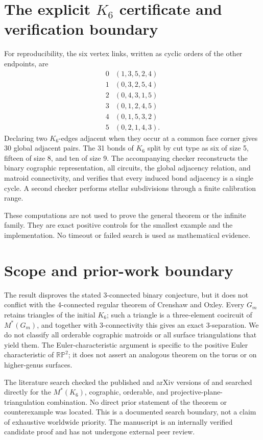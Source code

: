 \documentclass[11pt]{article}
\newcommand{\RP}{\mathbb{RP}}
\begin{document}
\section{The explicit $K_6$ certificate and verification boundary}

For reproducibility, the six vertex links, written as cyclic orders of the
other endpoints, are
\[
\begin{array}{c|c}
0&(1,3,5,2,4)\\
1&(0,3,2,5,4)\\
2&(0,4,3,1,5)\\
3&(0,1,2,4,5)\\
4&(0,1,5,3,2)\\
5&(0,2,1,4,3).
\end{array}
\]
Declaring two $K_6$-edges adjacent when they occur at a common face corner
gives 30 global adjacent pairs. The 31 bonds of $K_6$ split by cut type as six
of size 5, fifteen of size 8, and ten of size 9. The accompanying checker
reconstructs the binary cographic representation, all circuits, the global
adjacency relation, and matroid connectivity, and verifies that every induced
bond adjacency is a single cycle. A second checker performs stellar
subdivisions through a finite calibration range.

These computations are not used to prove the general theorem or the infinite
family. They are exact positive controls for the smallest example and the
implementation. No timeout or failed search is used as mathematical evidence.

\section{Scope and prior-work boundary}

The result disproves the stated 3-connected binary conjecture, but it does not
conflict with the 4-connected regular theorem of Crenshaw and Oxley. Every
$G_m$ retains triangles of the initial $K_6$; such a triangle is a
three-element cocircuit of $M^*(G_m)$, and together with 3-connectivity this
gives an exact 3-separation. We do not classify all
orderable cographic matroids or all surface triangulations that yield them.
The Euler-characteristic argument is specific to the positive Euler
characteristic of $\RP^2$; it does not assert an analogous theorem on the
torus or on higher-genus surfaces.

The literature search checked the published and arXiv versions of
\cite{crenshaw-oxley} and searched directly for the $M^*(K_6)$, cographic,
orderable, and projective-plane-triangulation combination. No direct prior
statement of the theorem or counterexample was located. This is a documented
search boundary, not a claim of exhaustive worldwide priority. The manuscript
is an internally verified candidate proof and has not undergone external peer
review.
\end{document}
